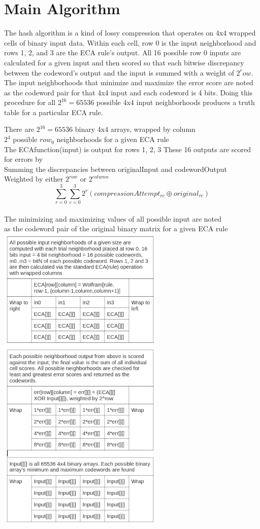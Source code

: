 \documentclass[11pt]{article}
\begin{document}
\section{Main Algorithm}
The hash algorithm is a kind of lossy compression that operates on 4x4 wrapped cells of binary input data. Within each cell, row 0 is the input neighborhood and rows 1, 2, and 3 are the ECA rule's output. All 16 possible row 0 inputs are calculated for a given input and then scored so that each bitwise discrepancy between the codeword's output and the input is summed with a weight of $2^row$. The input neighborhoods that minimize and maximize the error score are noted as the codeword pair for that 4x4 input and each codeword is 4 bits. Doing this procedure for all  $2^{16}=65536$ possible 4x4 input neighborhoods produces a truth table for a particular ECA rule.\\
\begin{center}
There are $2^{16}=65536$ binary 4x4 arrays, wrapped by column\\
$2^4$ possible $row_0$ neighborhoods for a given ECA rule\\
The ECAfunction(input) is output for rows 1, 2, 3
These 16 outputs are scored for errors by\\
Summing the discrepancies between originalInput and codewordOutput\\
Weighted by either $2^{row}$ or $2^{column}$\\
\[  \sum_{r=0}^{3} \sum_{c=0}^{3} 2^r ( compressionAttempt_{r c} \oplus original_{r c}) \]\\
 The minimizing and maximizing values of all possible input are noted\\
 as the codeword pair of the original binary matrix for a given ECA rule\\
\includegraphics{fourByfour}
\end{center}
\end{document}
